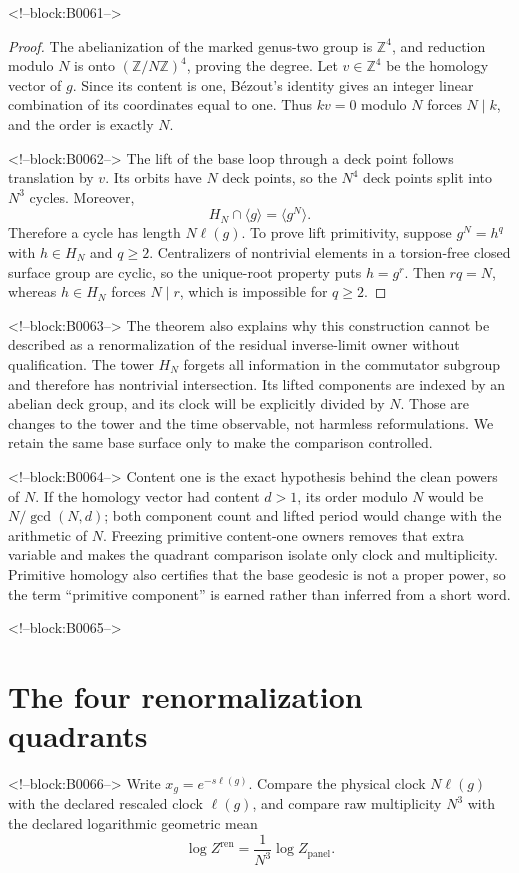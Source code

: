 \documentclass[11pt]{article}
\theoremstyle{definition}
\theoremstyle{remark}
\newcommand{\ZZ}{\mathbb Z}
\begin{document}
<!--block:B0061-->
\begin{proof}
The abelianization of the marked genus-two group is $\ZZ^4$, and reduction modulo $N$ is onto $(\ZZ/N\ZZ)^4$, proving the degree. Let $v\in\ZZ^4$ be the homology vector of $g$. Since its content is one, B\'ezout's identity gives an integer linear combination of its coordinates equal to one. Thus $kv=0$ modulo $N$ forces $N\mid k$, and the order is exactly $N$.

<!--block:B0062-->
The lift of the base loop through a deck point follows translation by $v$. Its orbits have $N$ deck points, so the $N^4$ deck points split into $N^3$ cycles. Moreover,
\[
H_N\cap\langle g\rangle=\langle g^N\rangle.
\]
Therefore a cycle has length $N\ell(g)$. To prove lift primitivity, suppose $g^N=h^q$ with $h\in H_N$ and $q\geq2$. Centralizers of nontrivial elements in a torsion-free closed surface group are cyclic, so the unique-root property puts $h=g^r$. Then $rq=N$, whereas $h\in H_N$ forces $N\mid r$, which is impossible for $q\geq2$.
\end{proof}

<!--block:B0063-->
The theorem also explains why this construction cannot be described as a renormalization of the residual inverse-limit owner without qualification. The tower $H_N$ forgets all information in the commutator subgroup and therefore has nontrivial intersection. Its lifted components are indexed by an abelian deck group, and its clock will be explicitly divided by $N$. Those are changes to the tower and the time observable, not harmless reformulations. We retain the same base surface only to make the comparison controlled.

<!--block:B0064-->
Content one is the exact hypothesis behind the clean powers of $N$. If the homology vector had content $d>1$, its order modulo $N$ would be $N/\gcd(N,d)$; both component count and lifted period would change with the arithmetic of $N$. Freezing primitive content-one owners removes that extra variable and makes the quadrant comparison isolate only clock and multiplicity. Primitive homology also certifies that the base geodesic is not a proper power, so the term ``primitive component'' is earned rather than inferred from a short word.

<!--block:B0065-->
\section{The four renormalization quadrants}

<!--block:B0066-->
Write $x_g=e^{-s\ell(g)}$. Compare the physical clock $N\ell(g)$ with the declared rescaled clock $\ell(g)$, and compare raw multiplicity $N^3$ with the declared logarithmic geometric mean
\[
\log Z^{\mathrm{ren}}=\frac1{N^3}\log Z_{\mathrm{panel}}.
\]
\end{document}
